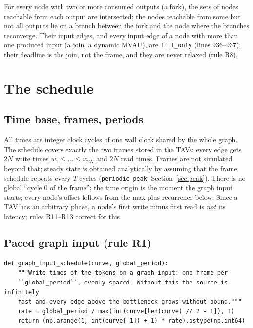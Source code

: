 \documentclass[10pt,a4paper]{article}
\newcommand{\code}[1]{\texttt{#1}}
\newcommand{\Tg}{T}           %
\newcommand{\NF}{N}            %
\begin{document}
For every node with two or more consumed outputs (a fork), the sets of nodes
reachable from each output are intersected; the nodes reachable from some but not
all outputs lie on a branch between the fork and the node where the branches
reconverge. Their input edges, and every input edge of a node with more than one
produced input (a join, a dynamic MVAU), are \code{fill\_only} (lines 936--937):
their deadline is the join, not the frame, and they are never relaxed (rule R8).

\section{The schedule}\label{sec:schedule}

\subsection{Time base, frames, periods}

All times are integer clock cycles of one wall clock shared by the whole graph.
The schedule covers exactly the two frames stored in the TAVs: every edge gets
$2\NF$ write times $w_1\le\dots\le w_{2\NF}$ and $2\NF$ read times. Frames are not
simulated beyond that; steady state is obtained analytically by assuming that the
frame schedule repeats every $\Tg$ cycles (\code{periodic\_peak},
Section~\ref{sec:peak}). There is no global ``cycle 0 of the frame'': the time
origin is the moment the graph input starts; every node's offset follows from the
max-plus recurrence below. Since a TAV has an arbitrary phase, a node's first write
minus first read is \emph{not} its latency; rules R11--R13 correct for this.

\subsection{Paced graph input (rule R1)}

\begin{lstlisting}[firstnumber=692,title={\texttt{src/finn/transformation/fpgadataflow/derive\_characteristic.py}, lines 692--697}]
def graph_input_schedule(curve, global_period):
    """Write times of the tokens on a graph input: one frame per
    ``global_period``, evenly spaced. Without this the source is infinitely
    fast and every edge above the bottleneck grows without bound."""
    rate = global_period / max(int(curve[len(curve) // 2 - 1]), 1)
    return (np.arange(1, int(curve[-1]) + 1) * rate).astype(np.int64)
\end{lstlisting}
\end{document}
